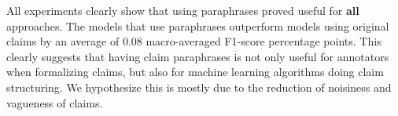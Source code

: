 
All experiments clearly show that using paraphrases proved useful for
\textbf{all} approaches.  The models that use paraphrases outperform models
using original claims by an average of $0.08$ macro-averaged F1-score
percentage points.  This clearly suggests that having claim paraphrases is not
only useful for annotators when formalizing claims, but also for machine
learning algorithms doing claim structuring.  We hypothesize this is mostly due
to the reduction of noisiness and vagueness of claims.  

